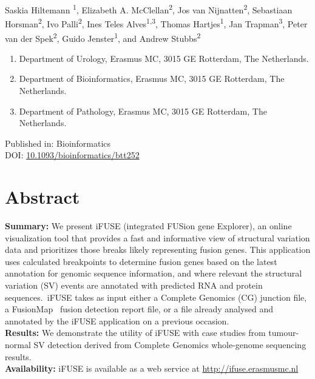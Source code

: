 \setcounter{NAT@ctr}{-1}

Saskia Hiltemann \textsuperscript{1}, Elizabeth A. McClellan\textsuperscript{2}, Jos van Nijnatten\textsuperscript{2}, Sebastiaan Horsman\textsuperscript{2}, Ivo Palli\textsuperscript{2}, Ines Teles Alves\textsuperscript{1,3}, Thomas Hartjes\textsuperscript{1}, Jan Trapman\textsuperscript{3}, Peter van der Spek\textsuperscript{2}, Guido Jenster\textsuperscript{1}, and Andrew Stubbs\textsuperscript{2}

\small
\begin{enumerate}
\itemsep-0.5em
\item Department of Urology, Erasmus MC, 3015 GE Rotterdam, The Netherlands.
\item Department of Bioinformatics, Erasmus MC, 3015 GE Rotterdam, The Netherlands.
\item Department of Pathology, Erasmus MC, 3015 GE Rotterdam, The Netherlands.
\end{enumerate}

Published in: Bioinformatics \\
DOI: \url{10.1093/bioinformatics/btt252} \\

\section*{Abstract}

\textbf{Summary:} We present iFUSE (integrated FUSion gene Explorer), an online visualization tool that provides a fast and informative view of structural variation data and prioritizes those breaks likely representing fusion genes. \color{black} This application uses calculated breakpoints to determine fusion genes based on the latest annotation for genomic sequence information, and where relevant the structural variation (SV) events are annotated with predicted RNA and protein sequences.\ iFUSE takes as input either a Complete Genomics (CG) junction file, a FusionMap~\cite{ge2011fusionmap} fusion detection report file, or a file already analysed and annotated by the iFUSE application on a previous occasion. \\
\textbf{Results:} We demonstrate the utility of iFUSE with case studies from tumour-normal SV detection derived from Complete Genomics whole-genome sequencing results. \\
\textbf{Availability:} iFUSE is available as a web service at \url{http://ifuse.erasmusmc.nl}


